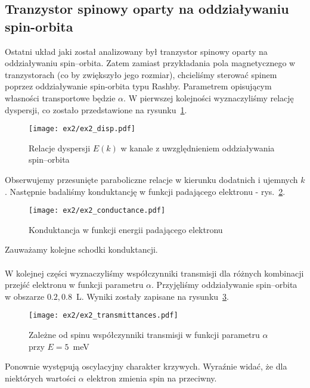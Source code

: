\documentclass{article}
\begin{document}
\subsection{Tranzystor spinowy oparty na oddziaływaniu spin-orbita}
Ostatni układ jaki został analizowany był tranzystor spinowy oparty na oddziaływaniu spin--orbita.
Zatem zamiast przykładania pola magnetycznego w tranzystorach (co by zwiększyło jego rozmiar), chcieliśmy sterować spinem poprzez oddziaływanie spin-orbita typu Rashby.
Parametrem opisującym własności transportowe będzie $\alpha$.
W pierwszej kolejności wyznaczyliśmy relację dyspersji, co zostało przedstawione na rysunku~\ref{fig:ex2-so-disp}.
\begin{figure}[htp!]
    \centering
    \texttt{[image: ex2/ex2\_disp.pdf]}
    \caption{Relacje dyspersji $E(k)$ w kanale z uwzględnieniem oddziaływania spin--orbita}
    \label{fig:ex2-so-disp}
\end{figure}
Obserwujemy przesunięte paraboliczne relacje w kierunku dodatnich i ujemnych $k$.
Następnie badaliśmy konduktancję w funkcji padającego elektronu - rys.~\ref{fig:ex2-conduct}.
\begin{figure}[htp!]
    \centering
    \texttt{[image: ex2/ex2\_conductance.pdf]}
    \caption{Konduktancja w funkcji energii padającego elektronu}
    \label{fig:ex2-conduct}
\end{figure}
Zauważamy kolejne schodki konduktancji.\\
\\
W kolejnej części wyznaczyliśmy współczynniki transmisji dla różnych kombinacji przejść elektronu w funkcji parametru $\alpha$.
Przyjęliśmy oddziaływanie spin--orbita w obszarze $0.2, 0.8$~L.
Wyniki zostały zapisane na rysunku~\ref{fig:ex2-trans}.
\begin{figure}[htp!]
    \centering
    \texttt{[image: ex2/ex2\_transmittances.pdf]}
    \caption{Zależne od spinu współczynniki transmisji w funkcji parametru $\alpha$ przy $E = 5$~meV}
    \label{fig:ex2-trans}
\end{figure}
Ponownie występują oscylacyjny charakter krzywych.
Wyraźnie widać, że dla niektórych wartości $\alpha$ elektron zmienia spin na przeciwny.\\
\end{document}
